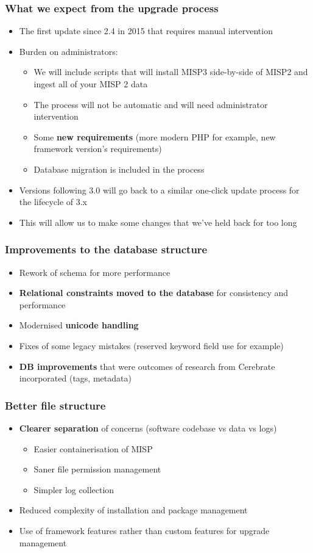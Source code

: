 \begin{frame}
  \frametitle{What we expect from the upgrade process}
  \begin{itemize}
     \item The first update since 2.4 in 2015 that requires manual intervention
     \item Burden on administrators:
     \begin{itemize}
         \item We will include scripts that will install MISP3 side-by-side of MISP2 and ingest all of your MISP 2 data
         \item The process will not be automatic and will need administrator intervention
         \item Some {\bf new requirements} (more modern PHP for example, new framework version's requirements)
         \item Database migration is included in the process
     \end{itemize}
     \item Versions following 3.0 will go back to a similar one-click update process for the lifecycle of 3.x
     \item This will allow us to make some changes that we've held back for too long
  \end{itemize}
\end{frame}

\begin{frame}
  \frametitle{Improvements to the database structure}
  \begin{itemize}
     \item Rework of schema for more performance
     \item {\bf Relational constraints moved to the database} for consistency and performance
     \item Modernised {\bf unicode handling}
     \item Fixes of some legacy mistakes (reserved keyword field use for example)
     \item {\bf DB improvements} that were outcomes of research from Cerebrate incorporated (tags, metadata)
  \end{itemize}
\end{frame}

\begin{frame}
  \frametitle{Better file structure}
  \begin{itemize}
     \item {\bf Clearer separation} of concerns (software codebase vs data vs logs)
     \begin{itemize}
         \item Easier containerisation of MISP
         \item Saner file permission management
         \item Simpler log collection
     \end{itemize}
     \item Reduced complexity of installation and package management
     \item Use of framework features rather than custom features for upgrade management
  \end{itemize}
\end{frame}

